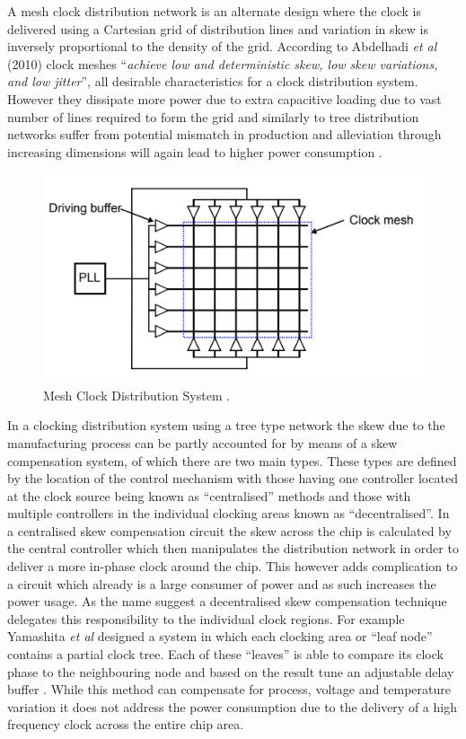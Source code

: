 \documentclass[11pt,english,british]{report}
\begin{document}
A mesh clock distribution network is an alternate design where the clock is delivered using a Cartesian grid of distribution lines and variation in skew is inversely proportional to the density of the grid. According to Abdelhadi \textit{et al} (2010) clock meshes ``\textit{achieve low and deterministic skew, low skew variations, and low jitter}'', all desirable characteristics for a clock distribution system. However they dissipate more power due to extra capacitive loading due to vast number of lines required to form the grid and similarly to tree distribution networks suffer from potential mismatch in production and alleviation through increasing dimensions will again lead to higher power consumption \cite{abdelhadi2010timing}. 
\begin{figure}[h]
	\centering
	\includegraphics[scale=0.6]{eldar_mesh}
	\caption{Mesh Clock Distribution System \cite{zianbetov2013phd}.}%
	\label{fig:mesh}
\end{figure}

In a clocking distribution system using a tree type network the skew due to the manufacturing process can be partly accounted for by means of a skew compensation system, of which there are two main types. These types are defined by the location of the control mechanism with those having one controller located at the clock source being known as ``centralised'' methods and those with multiple controllers in the individual clocking areas known as ``decentralised''. In a centralised skew compensation circuit the skew across the chip is calculated by the central controller which then manipulates the distribution network in order to deliver a more in-phase clock around the chip. This however adds complication to a circuit which already is a large consumer of power and as such increases the power usage.
As the name suggest a decentralised skew compensation technique delegates this responsibility to the individual clock regions. For example Yamashita \textit{et al} designed a system in which each clocking area or ``leaf node'' contains a partial clock tree. Each of these ``leaves'' is able to compare its clock phase to the neighbouring node and based on the result tune an adjustable delay buffer \cite{yamashita2005dynamic}. While this method can compensate for process, voltage and temperature variation it does not address the power consumption due to the delivery of a high frequency clock across the entire chip area.
\end{document}
